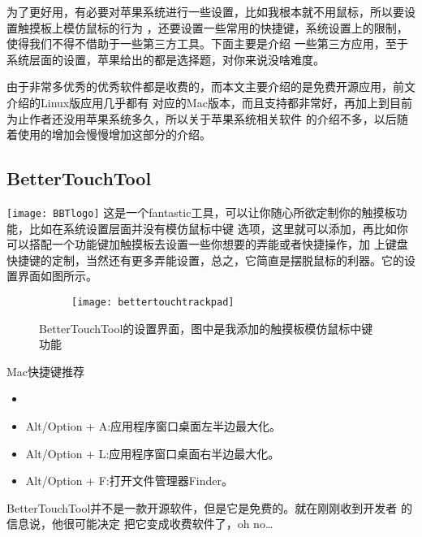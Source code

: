 \documentclass[11pt,fleqn]{book} %
\begin{document}
为了更好用，有必要对苹果系统进行一些设置，比如我根本就不用鼠标，所以要设置触摸板上模仿鼠标的行为
，还要设置一些常用的快捷键，系统设置上的限制，使得我们不得不借助于一些第三方工具。下面主要是介绍
一些第三方应用，至于系统层面的设置，苹果给出的都是选择题，对你来说没啥难度。

由于非常多优秀的优秀软件都是收费的，而本文主要介绍的是免费开源应用，前文介绍的Linux版应用几乎都有
对应的Mac版本，而且支持都非常好，再加上到目前为止作者还没用苹果系统多久，所以关于苹果系统相关软件
的介绍不多，以后随着使用的增加会慢慢增加这部分的介绍。
\subsection{BetterTouchTool}
  \texttt{[image: BBTlogo]}
  这是一个fantastic工具，可以让你随心所欲定制你的触摸板功能，比如在系统设置层面并没有模仿鼠标中键
  选项，这里就可以添加，再比如你可以搭配一个功能键加触摸板去设置一些你想要的弄能或者快捷操作，加
  上键盘快捷键的定制，当然还有更多弄能设置，总之，它简直是摆脱鼠标的利器。它的设置界面如图所示。
  
  \vspace{-0.5cm}
  \begin{figure}[h]
    \centering
    \begin{subfigure}{1.0\textwidth}
      \texttt{[image: bettertouchtrackpad]}
    \end{subfigure}
    \caption{BetterTouchTool的设置界面，图中是我添加的触摸板模仿鼠标中键功能}
  \end{figure}
  \begin{recommendation}{Mac快捷键推荐}
    \begin{itemize}
        \item
      \item Alt/Option + A:应用程序窗口桌面左半边最大化。
      \item Alt/Option + L:应用程序窗口桌面右半边最大化。
      \item Alt/Option + F:打开文件管理器Finder。
    \end{itemize}
  \end{recommendation}
\begin{notation}
  BetterTouchTool并不是一款开源软件，但是它是免费的。就在刚刚收到开发者 的信息说，他很可能决定
  把它变成收费软件了，oh no\dots
\end{notation}
\end{document}
